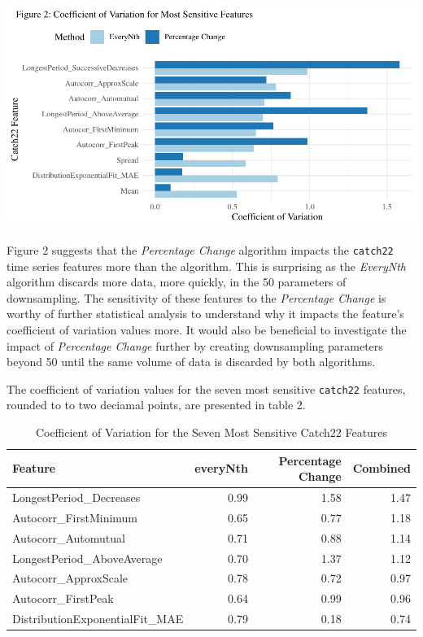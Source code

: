 \documentclass{article}
\begin{document}
\includegraphics{210431461_CSC8639_Dissertation_files/figure-latex/CombinedSensitivity-1.pdf}

Figure 2 suggests that the \emph{Percentage Change} algorithm impacts
the \texttt{catch22} time series features more than the algorithm. This
is surprising as the \emph{EveryNth} algorithm discards more data, more
quickly, in the 50 parameters of downsampling. The sensitivity of these
features to the \emph{Percentage Change} is worthy of further
statistical analysis to understand why it impacts the feature's
coefficient of variation values more. It would also be beneficial to
investigate the impact of \emph{Percentage Change} further by creating
downsampling parameters beyond 50 until the same volume of data is
discarded by both algorithms.

The coefficient of variation values for the seven most sensitive
\texttt{catch22} features, rounded to to two deciamal points, are
presented in table 2.

\vspace{-0.2cm}

\begin{table}[H]

\caption{\label{tab:unnamed-chunk-2}Coefficient of Variation for the Seven Most Sensitive Catch22 Features}
\centering
\begin{tabular}[t]{l|r|r|r}
\hline
Feature & everyNth & Percentage Change & Combined\\
\hline
LongestPeriod\_Decreases & 0.99 & 1.58 & 1.47\\
\hline
Autocorr\_FirstMinimum & 0.65 & 0.77 & 1.18\\
\hline
Autocorr\_Automutual & 0.71 & 0.88 & 1.14\\
\hline
LongestPeriod\_AboveAverage & 0.70 & 1.37 & 1.12\\
\hline
Autocorr\_ApproxScale & 0.78 & 0.72 & 0.97\\
\hline
Autocorr\_FirstPeak & 0.64 & 0.99 & 0.96\\
\hline
DistributionExponentialFit\_MAE & 0.79 & 0.18 & 0.74\\
\hline
\end{tabular}
\end{table}
\end{document}
